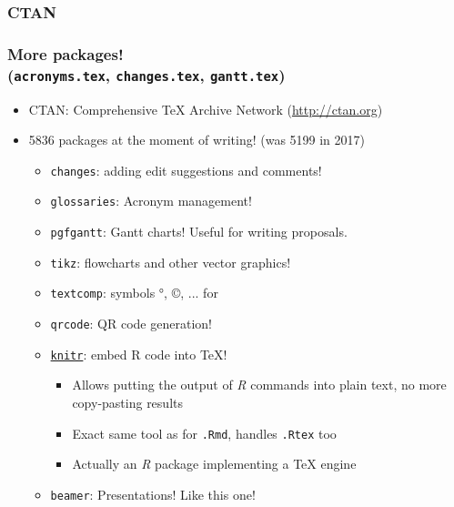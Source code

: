 \documentclass[xetex,colorlinks]{beamer} %
\begin{document}
  \subsubsection{CTAN}
  \begin{frame}
    \frametitle{More packages! \\ (\texttt{acronyms.tex}, \texttt{changes.tex}, \texttt{gantt.tex})}
    \begin{itemize}
     \item CTAN: Comprehensive \TeX{} Archive Network (\href{http://ctan.org}{http://ctan.org})
     \item 5836 packages at the moment of writing! (was 5199 in 2017)
      \begin{itemize}
      \item \texttt{changes}: adding edit suggestions and comments!
      \item \texttt{glossaries}: Acronym management!
      \item \texttt{pgfgantt}: Gantt charts! Useful for writing proposals.
      \item \texttt{tikz}: flowcharts and other vector graphics!
      \item \texttt{textcomp}: symbols °, ©, ... for 
      \item \texttt{qrcode}: QR code generation!
      \item \href{https://github.com/yihui/knitr-examples/blob/master/005-latex.Rtex}{\texttt{knitr}}: embed R code into \TeX{}!
      \begin{itemize}
	\item Allows putting the output of \textit{R} commands into plain text, no more copy-pasting results
	\item Exact same tool as for \texttt{.Rmd}, handles \texttt{.Rtex} too
	\item Actually an \textit{R} package implementing a \TeX{} engine
      \end{itemize}
      \item \texttt{beamer}: Presentations! Like this one!
      \end{itemize}
    \end{itemize}
  \end{frame}
\end{document}
